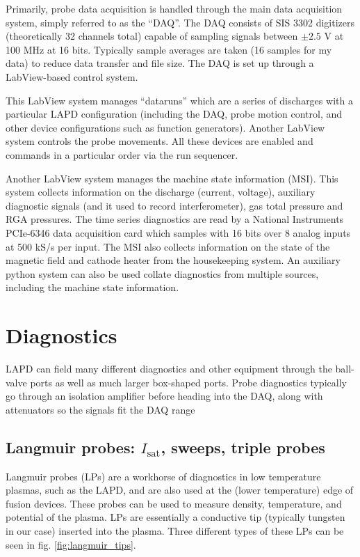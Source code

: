 Primarily, probe data acquisition is handled through the main data acquisition system, simply referred to as the ``DAQ''. The DAQ consists of SIS 3302 digitizers (theoretically 32 channels total) capable of sampling signals between $\pm 2.5$ V at 100 MHz at 16 bits. Typically sample averages are taken (16 samples for my data) to reduce data transfer and file size. The DAQ is set up through a LabView-based control system. 

This LabView system manages ``dataruns'' which are a series of discharges with a particular LAPD configuration (including the DAQ, probe motion control, and other device configurations such as function generators). Another LabView system controls the probe movements. All these devices are enabled and commands in a particular order via the run sequencer. 

Another LabView system manages the machine state information (MSI). This system collects information on the discharge (current, voltage), auxiliary diagnostic signals (and it used to record interferometer), gas total pressure and RGA pressures. The time series diagnostics are read by a National Instruments PCIe-6346 data acquisition card which samples with 16 bits over 8 analog inputs at 500 kS/s per input. The MSI also collects information on the state of the magnetic field and cathode heater from the housekeeping system. An auxiliary python system can also be used collate diagnostics from multiple sources, including the machine state information.

\section{Diagnostics}

LAPD can field many different diagnostics and other equipment through the ball-valve ports as well as much larger box-shaped ports.
Probe diagnostics typically go through an isolation amplifier before heading into the DAQ, along with attenuators so the signals fit the DAQ range

\subsection{Langmuir probes: $I_\text{sat}$, sweeps, triple probes}

Langmuir probes (LPs) are a workhorse of diagnostics in low temperature plasmas, such as the LAPD, and are also used at the (lower temperature) edge of fusion devices. These probes can be used to measure density, temperature, and potential of the plasma. LPs are essentially a conductive tip (typically tungsten in our case) inserted into the plasma. Three different types of these LPs can be seen in fig. \ref{fig:langmuir_tips}. 


